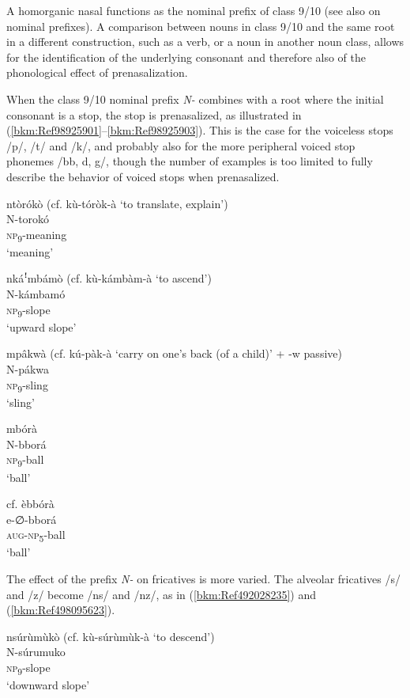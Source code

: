 A homorganic nasal functions as the nominal prefix of class 9/10 (see also  on nominal prefixes). A comparison between nouns in class 9/10 and the same root in a different construction, such as a verb, or a noun in another noun class, allows for the identification of the underlying consonant and therefore also of the phonological effect of prenasalization.

When the class 9/10 nominal prefix \textit{N-} combines with a root where the initial consonant is a stop, the stop is prenasal\-ized, as illustrated in (\ref{bkm:Ref98925901}--\ref{bkm:Ref98925903}). This is the case for the voiceless stops /p/, /t/ and /k/, and probably also for the more peripheral voiced stop phonemes /bb, d, g/, though the number of examples is too limited to fully describe the behavior of voiced stops when prenasalized.

\ea
\label{bkm:Ref98925901}
ntòrókò (cf. kù-tóròk-à ‘to translate, explain’)\\
N-torokó\\
\textsc{np}\textsubscript{9}-meaning\\
\glt ‘meaning’
\z

\ea
nkáꜝmbámò (cf. kù-kámbàm-à ‘to ascend’)\\
N-kámbamó\\
\textsc{np}\textsubscript{9}-slope\\
\glt ‘upward slope’
\z

\ea
mpâkwà (cf. kú-pàk-à ‘carry on one’s back (of a child)’ + -w passive)\\
N-pákwa\\
\textsc{np}\textsubscript{9}-sling\\
\glt ‘sling’
\z

\ea
\label{bkm:Ref98925903}
\ea
\glll mbórà\\
N-bborá\\
\textsc{np}\textsubscript{9}-ball\\
\glt ‘ball’

\ex  cf.
èbbórà\\
e-∅-bborá\\
\textsc{aug}-\textsc{np}\textsubscript{5}-ball\\
\glt ‘ball’
\z\z

The effect of the prefix \textit{N-} on fricatives is more varied. The alveolar fricatives /s/ and /z/ be\-come /ns/ and /nz/, as in (\ref{bkm:Ref492028235}) and (\ref{bkm:Ref498095623}).

\ea
\label{bkm:Ref492028235}
nsúrùmùkò (cf. kù-súrùmùk-à ‘to descend’)\\
N-súrumuko\\
\textsc{np}\textsubscript{9}-slope\\
\glt ‘downward slope’
\z

